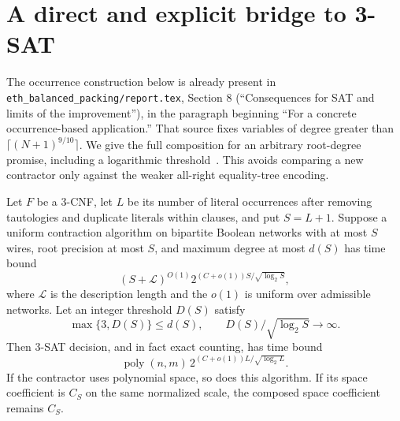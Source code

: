 \section{A direct and explicit bridge to 3-SAT}
\label{sec:occurrence-bridge}

The occurrence construction below is already present in
\texttt{eth\_balanced\_packing/report.tex}, Section 8 (``Consequences
for SAT and limits of the improvement''), in the paragraph beginning
``For a concrete occurrence-based application.'' That source fixes
variables of degree greater than $\lceil(N+1)^{9/10}\rceil$.
We give the full composition for an arbitrary root-degree promise,
including a logarithmic threshold~\cite{balanced}. This avoids comparing a new
contractor only against the weaker all-right equality-tree encoding.

\begin{proposition}
\label{prop:occurrence-bridge}
Let $F$ be a 3-CNF, let $L$ be its number of literal occurrences after
removing tautologies and duplicate literals within clauses, and put
$S=L+1$. Suppose a uniform contraction algorithm on bipartite Boolean
networks with at most $S$ wires, root precision at most $S$, and
maximum degree at most $d(S)$ has time bound
\[
 (S+\mathcal L)^{O(1)}
 2^{(C+o(1))S/\sqrt{\log_2 S}},
\]
where $\mathcal L$ is the description length and the $o(1)$ is uniform
over admissible networks. Let an integer threshold $D(S)$ satisfy
\[
 \max\{3,D(S)\}\le d(S),\qquad
 D(S)/\sqrt{\log_2 S}\longrightarrow\infty.
\]
Then 3-SAT decision, and in fact exact counting, has time bound
\[
 \operatorname{poly}(n,m)\,
 2^{(C+o(1))L/\sqrt{\log_2 L}}.
\]
If the contractor uses polynomial space, so does this algorithm.
If its space coefficient is $C_S$ on the same normalized scale,
the composed space coefficient remains $C_S$.
\end{proposition}

